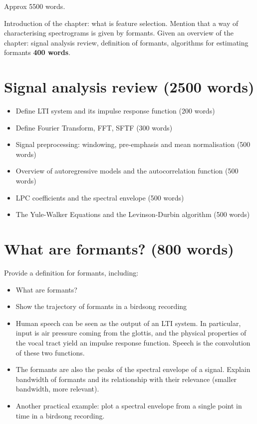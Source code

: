 \documentclass[../main.tex]{subfiles}
\begin{document}
Approx 5500 words.
\par Introduction of the chapter: what is feature selection. Mention that a way of characterising spectrograms is given by formants. Given an overview of the chapter: signal analysis review, definition of formants, algorithms for estimating formants \textbf{400 words}.

\section{Signal analysis review (2500 words)}
    \begin{itemize}
    \item Define LTI system and its impulse response function (200 words)
    \item Define Fourier Transform, FFT, SFTF (300 words)
    \item Signal preprocessing: windowing, pre-emphasis and mean normalisation (500 words)
    \item Overview of autoregressive models and the autocorrelation function (500 words)
    \item LPC coefficients and the spectral envelope (500 words)
    \item The Yule-Walker Equations and the Levinson-Durbin algorithm (500 words)
    \end{itemize}
    

\section{What are formants? (800 words)}
    Provide a definition for formants, including:
    \begin{itemize}
    \item What are formants? 
    \item Show the trajectory of formants in a birdsong recording
    \item Human speech can be seen as the output of an LTI system. In particular, input is air pressure coming from the glottis, and the physical properties of the vocal tract yield an impulse response function. Speech is the convolution of these two functions. %
    \item The formants are also the peaks of the spectral envelope of a signal. Explain bandwidth of formants and its relationship with their relevance (smaller bandwidth, more relevant).
    \item Another practical example: plot a spectral envelope from a single point in time in a birdsong recording.
    \end{itemize}
\end{document}
